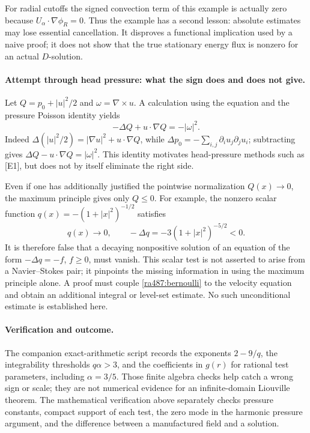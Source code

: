 \documentclass[11pt]{article}
\begin{document}
For radial cutoffs the signed convection term of this example is
actually zero because $U_\alpha\cdot\nabla\phi_R=0$. Thus the example
has a second lesson: absolute estimates may lose essential cancellation.
It disproves a functional implication used by a naive proof; it does not
show that the true stationary energy flux is nonzero for an actual
$D$-solution.

\paragraph{Attempt through head pressure: what the sign does and does not give.}
Let $Q=p_0+|u|^2/2$ and $\omega=\nabla\times u$. A calculation using
the equation and the pressure Poisson identity yields
\begin{equation}\label{ra487:bernoulli}
 -\Delta Q+u\cdot\nabla Q=-|\omega|^2.
\end{equation}
Indeed $\Delta(|u|^2/2)=|\nabla u|^2+u\cdot\nabla Q$, while
$\Delta p_0=-\sum_{i,j}\partial_i u_j\partial_j u_i$; subtracting
gives $\Delta Q-u\cdot\nabla Q=|\omega|^2$.
This identity motivates head-pressure methods such as [E1], but does
not by itself eliminate the right side.

Even if one has additionally justified the pointwise normalization
$Q(x)\to0$, the maximum principle gives only $Q\leq0$. For example,
the nonzero scalar function $q(x)=-(1+|x|^2)^{-1/2}$ satisfies
\[
 q(x)\to0,\qquad -\Delta q=-3(1+|x|^2)^{-5/2}<0.
\]
It is therefore false that a decaying nonpositive solution of an equation
of the form $-\Delta q=-f$, $f\geq0$, must vanish. This scalar test is
not asserted to arise from a Navier--Stokes pair; it pinpoints the missing
information in using the maximum principle alone. A proof must couple
\eqref{ra487:bernoulli} to the velocity equation and obtain an additional
integral or level-set estimate. No such unconditional estimate is
established here.

\paragraph{Verification and outcome.}
The companion exact-arithmetic script records the exponents
$2-9/q$, the integrability thresholds $q\alpha>3$, and the coefficients
in $g(r)$ for rational test parameters, including $\alpha=3/5$.
Those finite algebra checks help catch a wrong sign or scale; they are
not numerical evidence for an infinite-domain Liouville theorem.
The mathematical verification above separately checks pressure constants,
compact support of each test, the zero mode in the harmonic pressure
argument, and the difference between a manufactured field and a solution.
\end{document}
